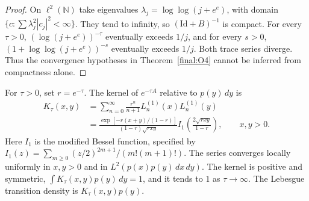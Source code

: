 \begin{proof}
On $\ell^2(\mathbb N)$ take eigenvalues
$\lambda_j=\log\log(j+e^e)$, with domain
$\{c:\sum\lambda_j^2|c_j|^2<\infty\}$.
They tend to infinity, so $(\mathrm{Id}+B)^{-1}$ is compact.
For every $\tau>0$, $(\log(j+e^e))^{-\tau}$ eventually exceeds
$1/j$, and for every $s>0$,
$(1+\log\log(j+e^e))^{-s}$ eventually exceeds $1/j$.
Both trace series diverge.  Thus the convergence hypotheses in
Theorem~\ref{final:O4} cannot be inferred from compactness alone.
\end{proof}

\begin{theorem}
\label{final:O4-heat-kernel}
For $\tau>0$, set $r=e^{-\tau}$.  The kernel of $e^{-\tau A}$ relative
to $p(y)\,dy$ is
\begin{align}
 K_\tau(x,y)
 &=\sum_{n=0}^\infty\frac{r^n}{n+1}
       L_n^{(1)}(x)L_n^{(1)}(y)\label{final:O4-kernel-series}\\
 &=\frac{\exp[-r(x+y)/(1-r)]}{(1-r)\sqrt{rxy}}
       I_1\!\left(\frac{2\sqrt{rxy}}{1-r}\right),
       \qquad x,y>0.\label{final:O4-hille-hardy}
\end{align}
Here $I_1$ is the modified Bessel function, specified by
$I_1(z)=\sum_{m\geq0}(z/2)^{2m+1}/(m!(m+1)!)$.
The series converges locally uniformly in $x,y>0$ and in
$L^2(p(x)p(y)\,dx\,dy)$.
The kernel is positive and symmetric,
$\int K_\tau(x,y)p(y)\,dy=1$, and it tends to $1$ as
$\tau\to\infty$.  The Lebesgue transition density is
$K_\tau(x,y)p(y)$.
\end{theorem}


